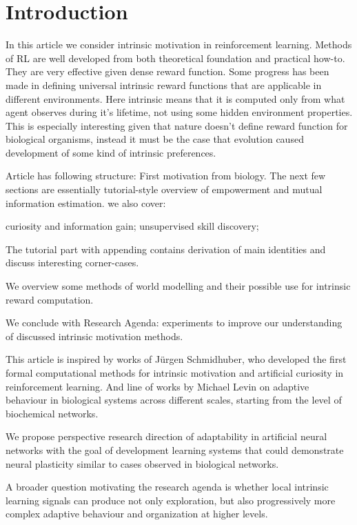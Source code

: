 
\section{Introduction}
In this article we consider intrinsic motivation in reinforcement learning. Methods of RL are well developed from both theoretical foundation and practical how-to. They are very effective given dense reward function. 
Some progress has been made in defining universal intrinsic reward functions that are applicable in different environments. Here intrinsic means that it is computed only from what agent observes during it's lifetime, not using some hidden environment properties. This is especially interesting given that nature doesn't define reward function for biological organisms, instead it must be the case that evolution caused development of some kind of intrinsic preferences. 

Article has following structure:
First motivation from biology.
The next few sections are essentially tutorial-style overview of empowerment and mutual information estimation.
we also cover:

curiosity and information gain;  
unsupervised skill discovery; 

The tutorial part with appending contains derivation of main identities and discuss interesting corner-cases.
   
We overview some methods of world modelling and their possible use for intrinsic reward computation.

We conclude with Research Agenda: experiments to improve our understanding of discussed intrinsic motivation methods.

This article is inspired by works of Jürgen Schmidhuber, who developed the first formal computational methods for intrinsic motivation and artificial curiosity in reinforcement learning. And line of works by Michael Levin on adaptive behaviour in biological systems across different scales, starting from the level of biochemical networks.

We propose perspective research direction of adaptability in artificial neural networks with the goal of development learning systems that could demonstrate neural plasticity similar to cases observed in biological networks.

A broader question motivating the research agenda is whether local intrinsic learning signals can produce not only exploration, but also progressively more complex  adaptive behaviour and organization at higher levels.

